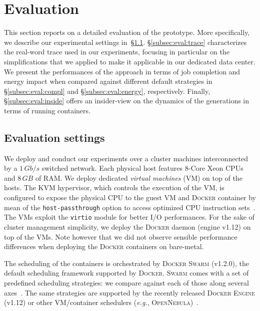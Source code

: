 
\section{Evaluation}
\label{sec:evaluation}

This section reports on a detailed evaluation of the \GP prototype.
More specifically, we describe our experimental settings in~\S\ref{subsec:eval:settings}.
\S\ref{subsec:eval:trace} characterizes the real-word trace used in our experiments, focusing in particular on the simplifications that we applied to make it applicable in our dedicated data center.
We present the performances of the \GP approach in terms of job completion and energy impact when compared against different default strategies in \S\ref{subsec:eval:compl} and \S\ref{subsec:eval:energy}, respectively.
Finally, \S\ref{subsec:eval:inside} offers an insider-view on the dynamics of the generations in terms of running containers.

\subsection{Evaluation settings}
\label{subsec:eval:settings}

We deploy and conduct our experiments over a cluster machines interconnected by a $1\,Gb/s$ switched network.
Each physical host features 8-Core Xeon CPUs and $8\,GB$ of RAM.
We deploy dedicated \emph{virtual machines} (VM) on top of the hosts.
The KVM hypervisor, which controls the execution of the VM, is configured to expose the physical CPU to the guest VM and \textsc{Docker} container by mean of the \texttt{host-passthrough} option to access optimized CPU instruction sets~\cite{host-passthrough}.
The VMs exploit the \texttt{virtio} module for better I/O performances.
For the sake of cluster management simplicity, we deploy the \textsc{Docker} daemon (engine v1.12) on top of the VMs.
Note however that we did not observe sensible performance differences when deploying the \textsc{Docker} containers on bare-metal.

The scheduling of the containers is orchestrated by \textsc{Docker Swarm} (v1.2.0), the default scheduling framework supported by \textsc{Docker}.
\textsc{Swarm} comes with a set of predefined scheduling strategies: we compare \GP against each of those along several axes~\cite{docker-strategy}.
The same strategies are supported by the recently released \textsc{Docker Engine} (v1.12) or other VM/container schedulers (\emph{e.g.}, \textsc{OpenNebula})~\cite{opennebula}.

